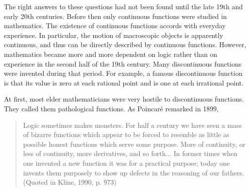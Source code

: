 

The right answers to these questions had not been found until the late 19th and early 20th centuries. Before then only continuous functions were studied in mathematics. The existence of continuous functions accords with everyday experience. In particular, the motion of macroscopic objects is apparently continuous, and thus can be directly described by continuous functions. However, mathematics became more and more dependent on logic rather than on experience in the second half of the 19th century. Many discontinuous functions were invented during that period. For example, a famous discontinuous function is that its value is zero at each rational point and is one at each irrational point.

At first, most elder mathematicians were very hostile to discontinuous functions. They called them pathological functions. As Poincar\'{e} remarked in 1899, 

\begin{quote}
Logic sometimes makes monsters. For half a century we have seen a mass of bizarre functions which appear to be forced to resemble as little as possible honest functions which serve some purpose. More of continuity, or less of continuity, more derivatives, and so forth... In former times when one invented a new function it was for a practical purpose; today one invents them purposely to show up defects in the reasoning of our fathers. (Quoted in Kline, 1990, p. 973)
\end{quote}


